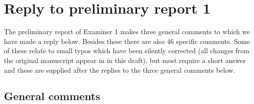 \section*{Reply to preliminary report 1}
\label{rep:1}

The preliminary report of Examiner 1 makes three general comments to which we have made a reply below. Besides these there are also 46 specific comments. Some of these relate to small typos which have been silently corrected (all changes from the original manuscript appear in {} in this draft), but most require a short answer and these are supplied after the replies to the three general comments below.

\subsection*{General comments}

